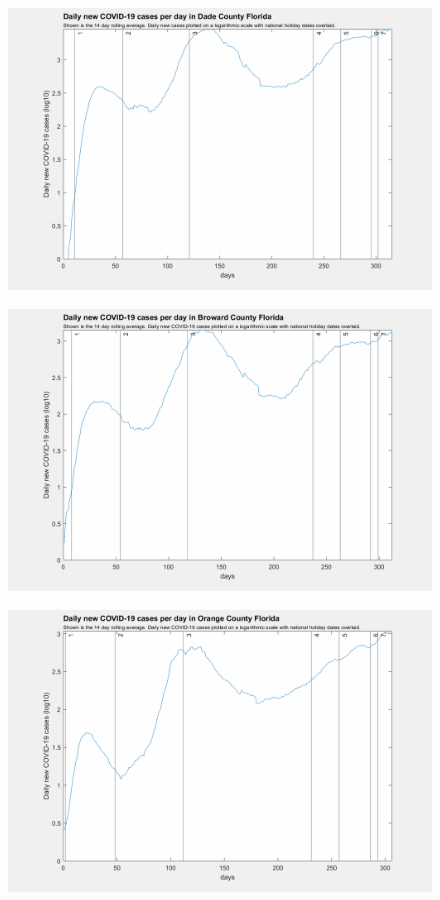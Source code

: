 \documentclass[]{article}
\begin{document}
\begin{figure}[!h]
	\includegraphics[width=\linewidth]{images/dade_cases_holiday_log.png}
	\caption{}
	\label{fig:images/dade_cases_holiday_logLabel}
\end{figure}

\begin{figure}[!h]
	\includegraphics[width=\linewidth]{images/broward_cases_holiday_log.png}
	\caption{}
	\label{fig:images/broward_cases_holiday_logLabel}
\end{figure}

\begin{figure}[!h]
	\includegraphics[width=\linewidth]{images/orange_cases_holiday_log.png}
	\caption{}
	\label{fig:images/orange_cases_holiday_logLabel}
\end{figure}
\end{document}
